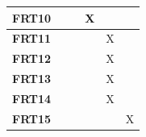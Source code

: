 \documentclass[12pt, titlepage]{article}
\begin{document}
\begin{table}[H]
\begin{tabular}{|l|lllll|}
  \textbf{FRT10} & \multicolumn{1}{l|}{}             & \multicolumn{1}{l|}{}             & \multicolumn{1}{l|}{X}            & \multicolumn{1}{l|}{}             &              \\ \hline
  \textbf{FRT11} & \multicolumn{1}{l|}{}             & \multicolumn{1}{l|}{}             & \multicolumn{1}{l|}{}             & \multicolumn{1}{l|}{X}            &              \\ \hline
  \textbf{FRT12} & \multicolumn{1}{l|}{}             & \multicolumn{1}{l|}{}             & \multicolumn{1}{l|}{}             & \multicolumn{1}{l|}{X}            &              \\ \hline
  \textbf{FRT13} & \multicolumn{1}{l|}{}             & \multicolumn{1}{l|}{}             & \multicolumn{1}{l|}{}             & \multicolumn{1}{l|}{X}            &              \\ \hline
  \textbf{FRT14} & \multicolumn{1}{l|}{}             & \multicolumn{1}{l|}{}             & \multicolumn{1}{l|}{}             & \multicolumn{1}{l|}{X}            &              \\ \hline
  \textbf{FRT15} & \multicolumn{1}{l|}{}             & \multicolumn{1}{l|}{}             & \multicolumn{1}{l|}{}             & \multicolumn{1}{l|}{}             & X            \\ \hline
  \end{tabular}
\end{table}
\end{document}
